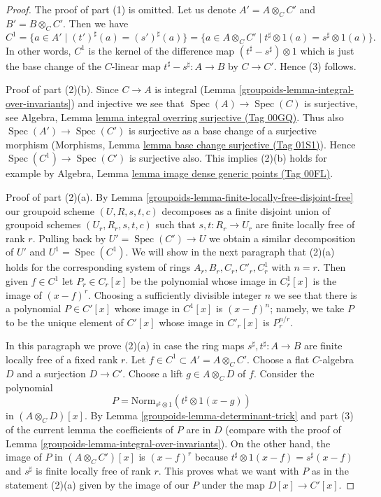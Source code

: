 \documentclass{amsart}
\theoremstyle{plain}
\theoremstyle{definition}
\theoremstyle{remark}
\numberwithin{equation}{subsection}
\def\Spec{\mathop{\mathrm{Spec}}}
\begin{document}
\begin{proof}
The proof of part (1) is omitted. Let us denote $A' = A \otimes_C C'$ and
$B' = B \otimes_C C'$. Then we have
$$
C^1
= \{a \in A' \mid (t')^\sharp(a) = (s')^\sharp(a) \}
= \{a \in A \otimes_C C' \mid t^\sharp \otimes 1(a) = s^\sharp \otimes 1(a) \}.
$$
In other words, $C^1$ is the kernel of the difference map
$(t^\sharp - s^\sharp) \otimes 1$ which is just the base change
of the $C$-linear map $t^\sharp - s^\sharp : A \to B$ by $C \to C'$.
Hence (3) follows.

\medskip\noindent
Proof of part (2)(b). Since $C \to A$ is integral
(Lemma \ref{groupoids-lemma-integral-over-invariants}) and injective we see that
$\Spec(A) \to \Spec(C)$ is surjective, see
Algebra, Lemma \href{https://stacks.math.columbia.edu/tag/00GQ}{lemma integral overring surjective (Tag 00GQ)}.
Thus also $\Spec(A') \to \Spec(C')$ is surjective
as a base change of a surjective morphism
(Morphisms, Lemma \href{https://stacks.math.columbia.edu/tag/01S1}{lemma base change surjective (Tag 01S1)}).
Hence $\Spec(C^1) \to \Spec(C')$ is surjective also.
This implies (2)(b) holds for example by
Algebra, Lemma \href{https://stacks.math.columbia.edu/tag/00FL}{lemma image dense generic points (Tag 00FL)}.

\medskip\noindent
Proof of part (2)(a). By Lemma \ref{groupoids-lemma-finite-locally-free-disjoint-free}
our groupoid scheme $(U, R, s, t, c)$ decomposes as a finite disjoint union
of groupoid schemes $(U_r, R_r, s, t, c)$ such that $s, t : R_r \to U_r$
are finite locally free of rank $r$. Pulling back by $U' = \Spec(C') \to U$
we obtain a similar decomposition of $U'$ and $U^1 = \Spec(C^1)$.
We will show in the next paragraph that (2)(a) holds for the corresponding
system of rings $A_r, B_r, C_r, C'_r, C^1_r$ with $n = r$.
Then given $f \in C^1$ let $P_r \in C_r[x]$ be the polynomial
whose image in $C^1_r[x]$ is the image of $(x - f)^r$.
Choosing a sufficiently divisible integer $n$ we see that
there is a polynomial $P \in C'[x]$ whose image in $C^1[x]$ is
$(x - f)^n$; namely, we take $P$ to be the unique element of
$C'[x]$ whose image in $C'_r[x]$ is $P_r^{n/r}$.

\medskip\noindent
In this paragraph we prove (2)(a) in case the ring maps
$s^\sharp, t^\sharp : A \to B$ are finite locally free of a fixed rank $r$.
Let $f \in C^1 \subset A' = A \otimes_C C'$. Choose a flat
$C$-algebra $D$ and a surjection $D \to C'$. Choose a lift
$g \in A \otimes_C D$ of $f$.
Consider the polynomial
$$
P = \text{Norm}_{s^\sharp \otimes 1}(t^\sharp \otimes 1(x - g))
$$
in $(A \otimes_C D)[x]$. By Lemma \ref{groupoids-lemma-determinant-trick}
and part (3) of the current lemma the coefficients of $P$ are in $D$
(compare with the proof of Lemma \ref{groupoids-lemma-integral-over-invariants}).
On the other hand, the image of $P$ in $(A \otimes_C C')[x]$ is
$(x - f)^r$ because $t^\sharp \otimes 1(x - f) = s^\sharp(x - f)$
and $s^\sharp$ is finite locally free of rank $r$.
This proves what we want with $P$ as in the statement (2)(a)
given by the image of our $P$ under the map $D[x] \to C'[x]$.
\end{proof}
\end{document}
